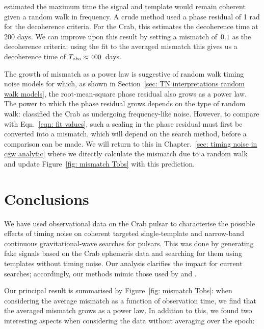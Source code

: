 \documentclass[../full_thesis/full_thesis.tex]{subfiles}
\begin{document}
\citet{Jones2004} estimated the maximum time the signal and template would
remain coherent given a random walk in  frequency. A crude method used a
phase residual of 1 rad for the decoherence criteria. For the Crab, this
estimates the decoherence time at 200 days. We can improve upon this result by
setting a mismatch of~$0.1$ as the decoherence criteria; using the fit to the
averaged mismatch this gives us a decoherence time of $T_{\textrm{obs}}\approx 400 $~days.

The growth of mismatch as a power law is suggestive of random walk
timing noise models for which, as shown in Section~\ref{sec: TN interpretations
random walk models}, the root-mean-square phase residual also grows as a power
law. The power to which the phase residual grows depends on the type of random
walk: \citep{Boynton1972, Cordes1981} classified the Crab as undergoing
frequency-like noise.  However, to compare with Eqn.~\eqref{eqn: fit values},
such a scaling in the phase residual must first be converted into a mismatch,
which will depend on the search method, before a comparison can be made. We
will return to this in Chapter.~\ref{sec: timing noise in cgw analytic} where
we directly calculate the mismatch due to a random walk and update
Figure~\ref{fig: mismatch Tobs} with this prediction.


\section{Conclusions}
\label{sec: narrow-band conclusions}
We have used observational data on the Crab pulsar to characterise the possible
effects of timing noise on coherent targeted single-template  and narrow-band
continuous gravitational-wave searches for pulsars.  This was done by generating fake
signals based on the Crab ephemeris data and searching for them using templates
without timing noise. Our analysis clarifies the impact for current searches;
accordingly, our methods mimic those used by \citet{ligo2008} and \citet{ligo2015}.

Our principal result is summarised by Figure~\ref{fig: mismatch Tobs}:
when considering the average mismatch as
a function of observation time,  we find that the averaged
mismatch grows as a power law. In addition to this, we found two interesting
aspects when considering the data without averaging over the epoch:
\end{document}
